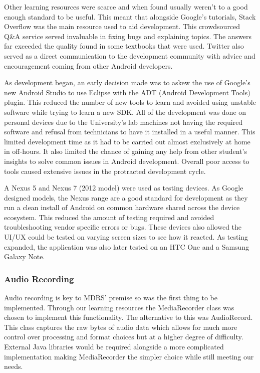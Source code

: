 \documentclass{l3proj}
\begin{document}
Other learning resources were scarce and when found usually weren't to a good enough standard to be useful. This meant that alongside Google's tutorials, Stack Overflow was the main resource used to aid development. This crowdsourced Q&A service served invaluable in fixing bugs and explaining topics. The answers far exceeded the quality found in some textbooks that were used. Twitter also served as a direct communication to the development community with advice and encouragement coming from other Android developers.

As development began, an early decision made was to askew the use of Google's new Android Studio to use Eclipse with the ADT (Android Development Tools) plugin. This reduced the number of new tools to learn and avoided using unstable software while trying to learn a new SDK. All of the development was done on personal devices due to the University's lab machines not having the required software and refusal from technicians to have it installed in a useful manner. This limited development time as it had to be carried out almost exclusively at home in off-hours. It also limited the chance of gaining any help from other student's insights to solve common issues in Android development. Overall poor access to tools caused extensive issues in the protracted  development cycle.

A Nexus 5 and Nexus 7 (2012 model) were used as testing devices. As Google designed models, the Nexus range are a good standard for development as they run a clean install of Android on common hardware shared across the device ecosystem. This reduced the amount of testing required and avoided troubleshooting vendor specific errors or bugs. These devices also allowed the UI/UX could be tested on varying screen sizes to see how it reacted. As testing expanded, the application was also later tested on an HTC One and a Samsung Galaxy Note.

\subsubsection{Audio Recording}    Audio recording is key to MDRS' premise so was the first thing to be implemented. Through our learning resources the MediaRecorder class was chosen to implement this functionality. The alternative to this was AudioRecord. This class captures the raw bytes of audio data which allows for much more control over processing and format choices but at a higher degree of difficulty. External Java libraries would be required alongside a more complicated implementation making MediaRecorder the simpler choice while still meeting our needs.
\end{document}
